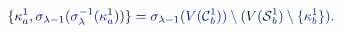 \documentclass[12pt]{article}
\begin{document}
\makeatletter
\renewcommand*{\@textcolor}[3]{%
  \protect\leavevmode
  \begingroup
    \color#1{#2}#3%
  \endgroup
}
\makeatother
\begin{displaymath}
\mathcolor[RGB]{0,0,15}{\{} \mathcolor[RGB]{0,0,30}{\kappa} _ { \mathcolor[RGB]{0,0,45}{a} } ^ { \mathcolor[RGB]{0,0,60}{1} } \mathcolor[RGB]{0,0,75}{,} \mathcolor[RGB]{0,0,90}{\sigma} _ { \mathcolor[RGB]{0,0,105}{\lambda} \mathcolor[RGB]{0,0,120}{-} \mathcolor[RGB]{0,0,135}{1} } \mathcolor[RGB]{0,0,150}{(} \mathcolor[RGB]{0,0,165}{\sigma} _ { \mathcolor[RGB]{0,0,180}{\lambda} } ^ { \mathcolor[RGB]{0,0,195}{-} \mathcolor[RGB]{0,0,210}{1} } \mathcolor[RGB]{0,0,225}{(} \mathcolor[RGB]{0,0,240}{\kappa} _ { \mathcolor[RGB]{0,0,255}{a} } ^ { \mathcolor[RGB]{0,15,0}{1} } \mathcolor[RGB]{0,15,15}{)} \mathcolor[RGB]{0,15,30}{)} \mathcolor[RGB]{0,15,45}{\}} \mathcolor[RGB]{0,15,60}{=} \mathcolor[RGB]{0,15,75}{\sigma} _ { \mathcolor[RGB]{0,15,90}{\lambda} \mathcolor[RGB]{0,15,105}{-} \mathcolor[RGB]{0,15,120}{1} } \mathcolor[RGB]{0,15,135}{(} \mathcolor[RGB]{0,15,150}{V} \mathcolor[RGB]{0,15,165}{(} \mathcal { \mathcolor[RGB]{0,15,180}{C} } _ { \mathcolor[RGB]{0,15,195}{b} } ^ { \mathcolor[RGB]{0,15,210}{1} } \mathcolor[RGB]{0,15,225}{)} \mathcolor[RGB]{0,15,240}{)} \mathcolor[RGB]{0,15,255}{\setminus} \mathcolor[RGB]{0,30,0}{(} \mathcolor[RGB]{0,30,15}{V} \mathcolor[RGB]{0,30,30}{(} \mathcal { \mathcolor[RGB]{0,30,45}{S} } _ { \mathcolor[RGB]{0,30,60}{b} } ^ { \mathcolor[RGB]{0,30,75}{1} } \mathcolor[RGB]{0,30,90}{)} \mathcolor[RGB]{0,30,105}{\setminus} \mathcolor[RGB]{0,30,120}{\{} \mathcolor[RGB]{0,30,135}{\kappa} _ { \mathcolor[RGB]{0,30,150}{b} } ^ { \mathcolor[RGB]{0,30,165}{1} } \mathcolor[RGB]{0,30,180}{\}} \mathcolor[RGB]{0,30,195}{)} \mathcolor[RGB]{0,30,210}{.}
\end{displaymath}
\end{document}
